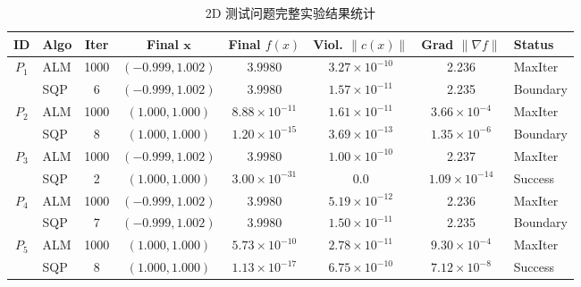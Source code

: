 \documentclass[a4paper,12pt]{article}
\begin{document}
\begin{table}[H]
    \centering
    \caption{2D 测试问题完整实验结果统计}
    \label{tab:full_results_2d}
    \scriptsize 
    \setlength{\tabcolsep}{3.5pt} 
    \begin{tabular}{clc c ccc l}
        \toprule
        \textbf{ID} & \textbf{Algo} & \textbf{Iter} & \textbf{Final } $\mathbf{x}$ & \textbf{Final } $f(x)$ & \textbf{Viol.} $\|c(x)\|$ & \textbf{Grad} $\|\nabla f\|$ & \textbf{Status} \\
        \midrule
        
        \multirow{2}{*}{$P_1$} 
        & ALM & 1000 & $(-0.999, 1.002)$ & 3.9980 & $3.27 \times 10^{-10}$ & 2.236 & MaxIter \\
        & SQP & 6    & $(-0.999, 1.002)$ & 3.9980 & $1.57 \times 10^{-11}$ & 2.235 & Boundary \\ \cmidrule{1-8}
        
        \multirow{2}{*}{$P_2$} 
        & ALM & 1000 & $(1.000, 1.000)$ & $8.88 \times 10^{-11}$ & $1.61 \times 10^{-11}$ & $3.66 \times 10^{-4}$ & MaxIter \\
        & SQP & 8    & $(1.000, 1.000)$ & $1.20 \times 10^{-15}$ & $3.69 \times 10^{-13}$ & $1.35 \times 10^{-6}$ & Boundary \\ \cmidrule{1-8}

        \multirow{2}{*}{$P_3$} 
        & ALM & 1000 & $(-0.999, 1.002)$ & 3.9980 & $1.00 \times 10^{-10}$ & 2.237 & MaxIter \\
        & SQP & 2    & $(1.000, 1.000)$ & $3.00 \times 10^{-31}$ & 0.0 & $1.09 \times 10^{-14}$ & Success \\ \cmidrule{1-8}

        \multirow{2}{*}{$P_4$} 
        & ALM & 1000 & $(-0.999, 1.002)$ & 3.9980 & $5.19 \times 10^{-12}$ & 2.236 & MaxIter \\
        & SQP & 7    & $(-0.999, 1.002)$ & 3.9980 & $1.50 \times 10^{-11}$ & 2.235 & Boundary \\ \cmidrule{1-8}

        \multirow{2}{*}{$P_5$} 
        & ALM & 1000 & $(1.000, 1.000)$ & $5.73 \times 10^{-10}$ & $2.78 \times 10^{-11}$ & $9.30 \times 10^{-4}$ & MaxIter \\
        & SQP & 8    & $(1.000, 1.000)$ & $1.13 \times 10^{-17}$ & $6.75 \times 10^{-10}$ & $7.12 \times 10^{-8}$ & Success \\ \cmidrule{1-8}


\end{tabular}
\end{table}
\end{document}
